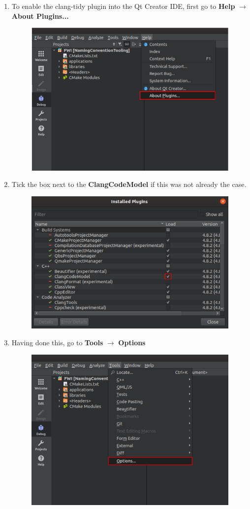 \documentclass[10pt]{article}
\begin{document}
\begin{enumerate}
\item To enable the clang-tidy plugin into the Qt Creator IDE, first go to \textbf{Help} $\rightarrow$ \textbf{About Plugins...}
\begin{figure}[h!]
\centering
\includegraphics[width=0.6 \textwidth]{clang-tidy1.png}
\end{figure}

\item Tick the box next to the \textbf{ClangCodeModel} if this was not already the case.
\begin{figure}[h!]
\centering
\includegraphics[width=0.6 \textwidth]{clang-tidy2.png}
\end{figure}

\newpage

\item Having done this, go to \textbf{Tools} $\rightarrow$ \textbf{Options}
\begin{figure}[h!]
\centering
\includegraphics[width=0.6 \textwidth]{clang-tidy3.png}
\end{figure}



\end{enumerate}
\end{document}
